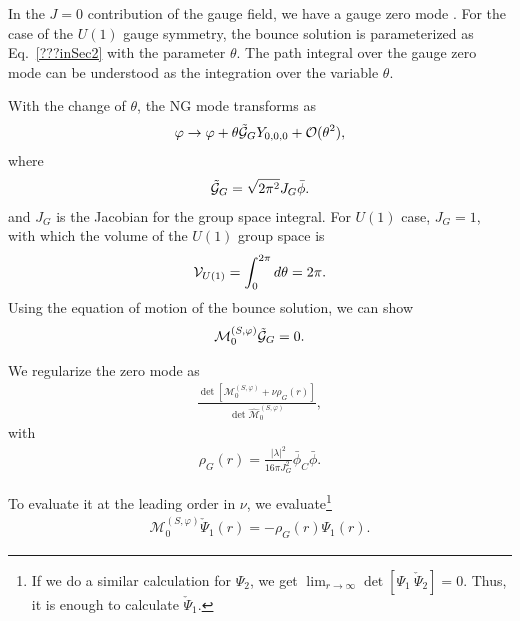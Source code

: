 \documentclass[12pt]{article}
\begin{document}
In the $J = 0$ contribution of the gauge field, we have a gauge zero
mode \cite{Kusenko:1996bv}.  For the case of the $U(1)$ gauge
symmetry, the bounce solution is parameterized as Eq.\
\eqref{???inSec2} with the parameter $\theta$.  The path integral over
the gauge zero mode can be understood as the integration over the
variable $\theta$.  

With the change of $\theta$, the NG mode transforms as 
\begin{align}
  \varphi \to 
  \varphi + \theta \tilde{{\cal G}}_G Y_{0,0,0} +\mathcal O(\theta^2),
\end{align}
where
\begin{align}
  \tilde{{\cal G}}_G = \sqrt{2\pi^2}J_G\bar\phi.
\end{align}
and $J_G$ is the Jacobian for the group space integral. For $U(1)$ case,
$J_G = 1$, with which the volume of the $U(1)$ group space is
\begin{align}
  {\cal V}_{U(1)} = \int_0^{2\pi} d\theta = 2\pi.
\end{align}
Using the equation of motion of the bounce solution, we can show
\begin{align}
  \mathcal M^{(S,\varphi)}_0 \tilde {{\cal G}}_G = 0.
\end{align}


We regularize the zero mode as
\begin{align}
 \frac{\det
 \left[
  \mathcal M_0^{(S,\varphi)}+\nu\rho_G(r)
 \right]}{\det\widehat{\mathcal M}_0^{(S,\varphi)}},
\end{align}
with
\begin{align}
 \rho_G(r) = \frac{|\lambda|^2}{16\pi J_G^2}\bar\phi_C\bar\phi.
\end{align}

To evaluate it at the leading order in $\nu$, we evaluate\footnote{If we
 do a similar calculation for $\Psi_2$, we get
 $\lim_{r\to\infty}\det[\Psi_1~\check\Psi_2] = 0$. Thus, it is enough to
 calculate $\check\Psi_1$.}
\begin{align}
 \mathcal M^{(S,\varphi)}_0\check\Psi_1(r) = -\rho_G(r)\Psi_1(r).
\end{align}
\end{document}
